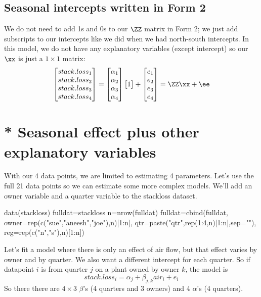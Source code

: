 \subsection{Seasonal intercepts written in Form 2}
We do not need to add 1s and 0s to our $\ZZ$ matrix in Form 2; we just add subscripts to our intercepts like we did when we had north-south intercepts.  In this model, we do not have any explanatory variables (except intercept) so our $\xx$ is just a $1 \times 1$ matrix:
\begin{equation}\label{eqn:stackloss.form2.season}
\begin{bmatrix}stack.loss_1\\ stack.loss_2\\ stack.loss_3\\ stack.loss_4\end{bmatrix}
= 
\begin{bmatrix}
\alpha_1\\
\alpha_2\\
\alpha_3\\
\alpha_4
\end{bmatrix}\begin{bmatrix}1\end{bmatrix}
+
\begin{bmatrix}e_1\\e_2\\e_3\\e_4\end{bmatrix}=\ZZ\xx+\ee
\end{equation}

\section{* Seasonal effect plus other explanatory variables}
With our 4 data points, we are limited to estimating 4 parameters.  Let's use the full 21 data points so we can estimate some more complex models.  We'll add an owner variable and a quarter variable to the stackloss dataset.

\begin{Schunk}
\begin{Sinput}
 data(stackloss)
 fulldat=stackloss
 n=nrow(fulldat)
 fulldat=cbind(fulldat, 
           owner=rep(c("sue","aneesh","joe"),n)[1:n], 
           qtr=paste("qtr",rep(1:4,n)[1:n],sep=""),
           reg=rep(c("n","s"),n)[1:n])
\end{Sinput}
\end{Schunk}

Let's fit a model where there is only an effect of air flow, but that effect varies by owner and by quarter.  We also want a different intercept for each quarter.  So if datapoint $i$ is from quarter $j$ on a plant owned by owner $k$, the model is
\begin{equation}\label{stackloss.mult.beta}
stack.loss_i = \alpha_j + \beta_{j,k} air_i + e_i
\end{equation}
So there there are $4 \times 3$ $\beta$'s (4 quarters and 3 owners) and 4 $\alpha$'s (4 quarters).

